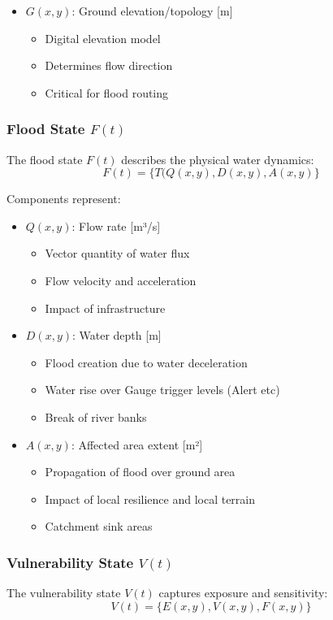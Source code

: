 \documentclass{article}
\begin{document}
\begin{itemize}
\item $G(x,y)$: Ground elevation/topology [m]
    \begin{itemize}
    \item Digital elevation model
    \item Determines flow direction
    \item Critical for flood routing
    \end{itemize}
\end{itemize}

\subsubsection{Flood State $F(t)$}
The flood state $F(t)$ describes the physical water dynamics:
\begin{equation}
	F(t) = \{T(Q(x,y), D(x,y), A(x,y)\}
\end{equation}

Components represent:
\begin{itemize}
\item $Q(x,y)$: Flow rate [m³/s]
    \begin{itemize}
    \item Vector quantity of water flux
    \item Flow velocity and acceleration
    \item Impact of infrastructure
    \end{itemize}

\item $D(x,y)$: Water depth [m]
    \begin{itemize}
    \item Flood creation due to water deceleration
    \item Water rise over Gauge trigger levels (Alert etc)
    \item Break of river banks
    \end{itemize}

\item $A(x,y)$: Affected area extent [m²]
    \begin{itemize}
    \item Propagation of flood over ground area
    \item Impact of local resilience and local terrain
    \item Catchment sink areas
    \end{itemize}
\end{itemize}

\subsubsection{Vulnerability State $V(t)$}
The vulnerability state $V(t)$ captures exposure and sensitivity:
\begin{equation}
	V(t) = \{E(x,y), V(x,y), F(x,y)\}
\end{equation}
\end{document}
